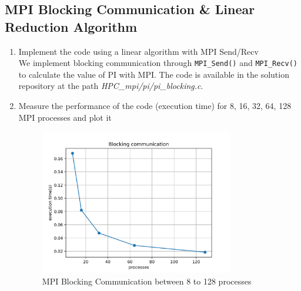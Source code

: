 \documentclass[12pt]{article}
\begin{document}
\subsection{MPI Blocking Communication \& Linear Reduction Algorithm}
\begin{enumerate}
    \item Implement the code using a linear algorithm with MPI Send/Recv\\
    We implement blocking communication through \texttt{MPI\_Send()} and \texttt{MPI\_Recv()} to calculate the value of PI with MPI. The code is available in the solution repository at the path \textit{HPC\_mpi/pi/pi\_blocking.c}.
    \item Measure the performance of the code (execution time) for 8, 16, 32,  64, 128 MPI processes and plot it
    \begin{figure}[H]
        \centering
        \includegraphics[width=0.8\textwidth]{graph-pi-blocking.png}
        \caption{MPI Blocking Communication between 8 to 128 processes}
        \label{fig:blocking}
    \end{figure}



\end{enumerate}
\end{document}
